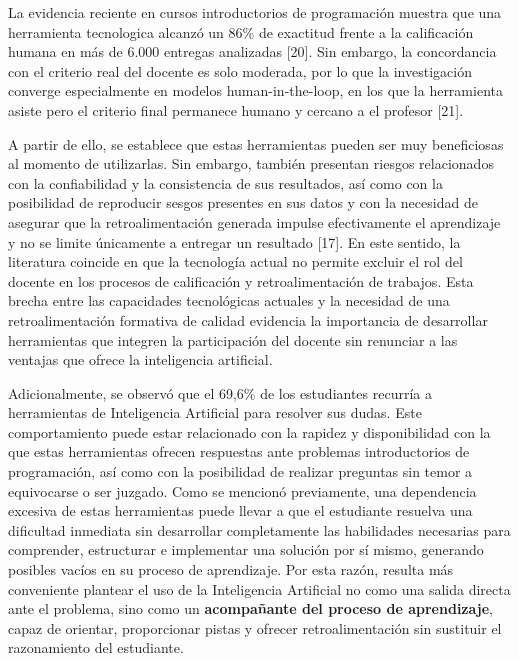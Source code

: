 \documentclass[letterpaper, 10 pt, conference]{ieeeconf}
\begin{document}
    La evidencia reciente en cursos introductorios de programación muestra que una herramienta tecnologica alcanzó un 86\% de exactitud frente a la calificación humana en más de 6.000 entregas analizadas [20]. Sin embargo, la concordancia con el criterio real del docente es solo moderada, por lo que la investigación converge especialmente en  modelos human-in-the-loop, en los que la herramienta asiste pero el criterio final permanece humano y cercano a el profesor [21].

    A partir de ello, se establece que estas herramientas pueden ser muy beneficiosas al momento de utilizarlas. Sin embargo, también presentan riesgos relacionados con la confiabilidad y la consistencia de sus resultados, así como con la posibilidad de reproducir sesgos presentes en sus datos y con la necesidad de asegurar que la retroalimentación generada impulse efectivamente el aprendizaje y no se limite únicamente a entregar un resultado [17]. En este sentido, la literatura coincide en que la tecnología actual no permite excluir el rol del docente en los procesos de calificación y retroalimentación de trabajos. Esta brecha entre las capacidades tecnológicas actuales y la necesidad de una retroalimentación formativa de calidad evidencia la importancia de desarrollar herramientas que integren la participación del docente sin renunciar a las ventajas que ofrece la inteligencia artificial.

    Adicionalmente, se observó que el 69,6\% de los estudiantes recurría a herramientas de Inteligencia Artificial para resolver sus dudas. Este comportamiento puede estar relacionado con la rapidez y disponibilidad con la que estas herramientas ofrecen respuestas ante problemas introductorios de programación, así como con la posibilidad de realizar preguntas sin temor a equivocarse o ser juzgado. Como se mencionó previamente, una dependencia excesiva de estas herramientas puede llevar a que el estudiante resuelva una dificultad inmediata sin desarrollar completamente las habilidades necesarias para comprender, estructurar e implementar una solución por sí mismo, generando posibles vacíos en su proceso de aprendizaje. Por esta razón, resulta más conveniente plantear el uso de la Inteligencia Artificial no como una salida directa ante el problema, sino como un \textbf{acompañante del proceso de aprendizaje}, capaz de orientar, proporcionar pistas y ofrecer retroalimentación sin sustituir el razonamiento del estudiante.
\end{document}
